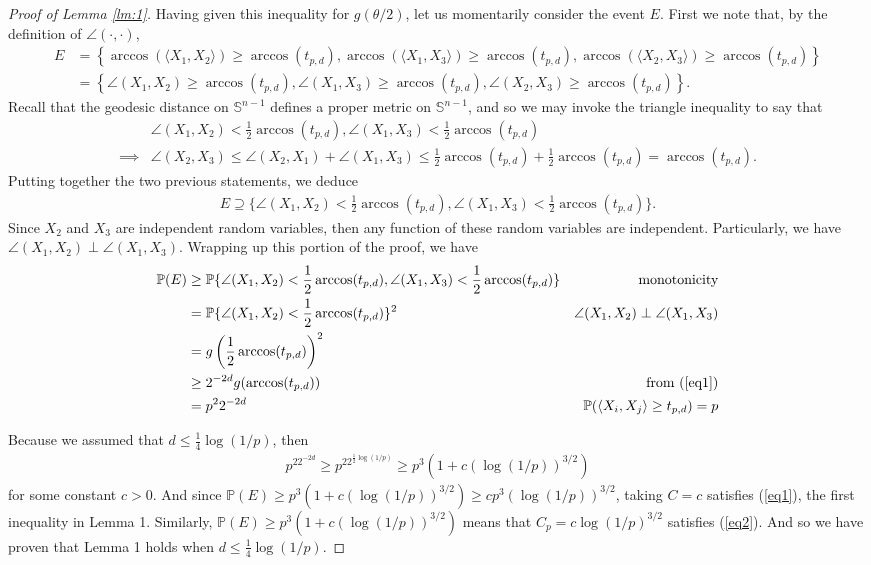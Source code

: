 \documentclass{article}
\begin{document}
\begin{proof}[Proof of Lemma \ref{lm:1}]
Having given this inequality for $g(\theta/2)$, let us momentarily consider the event $E$. First we note that, by the definition of $\angle(\cdot, \cdot)$,
\begin{align*}
    E &= \left\{ \arccos(\langle X_1, X_2 \rangle) \geq \arccos(t_{p,d}), \arccos(\langle X_1, X_3 \rangle) \geq \arccos(t_{p,d}), \arccos(\langle X_2, X_3 \rangle) \geq  \arccos(t_{p,d}) \right\}\\
    &= \left\{ \angle(X_1, X_2) \geq \arccos(t_{p,d}), \angle(X_1, X_3) \geq \arccos(t_{p,d}), \angle(X_2, X_3) \geq  \arccos(t_{p,d}) \right\}.
\end{align*}
Recall that the geodesic distance on $\mathbb{S}^{n-1}$ defines a proper metric on $\mathbb{S}^{n-1}$, and so we may invoke the triangle inequality to say that 
\begin{align*}
    &\angle(X_1, X_2) < \frac{1}{2}\arccos(t_{p,d}), \angle (X_1, X_3) < \frac{1}{2}\arccos(t_{p,d})\\
    \implies & \angle(X_2, X_3) \leq \angle(X_2, X_1) + \angle(X_1, X_3) \leq \frac{1}{2}\arccos(t_{p,d}) + \frac{1}{2}\arccos(t_{p,d}) = \arccos(t_{p,d}).
\end{align*}
Putting together the two previous statements, we deduce
\begin{align*}
    E \supseteq  \{\angle(X_1, X_2) < \frac{1}{2}\arccos(t_{p,d}), \angle (X_1, X_3) < \frac{1}{2}\arccos(t_{p,d})\}.
\end{align*}
Since $X_2$ and $X_3$ are independent random variables, then any function of these random variables are independent. Particularly, we have $\angle(X_1, X_2) \perp \angle(X_1, X_3)$. Wrapping up this portion of the proof, we have
\begin{align*}
    \mathbb{P}(E) & \geq \mathbb{P} \{ \angle(X_1, X_2) < \frac{1}{2} \arccos(t_{p,d}), \angle(X_1, X_3) < \frac{1}{2} \arccos(t_{p,d}) \} & \text{monotonicity}\\
    &= \mathbb{P} \{ \angle(X_1, X_2) < \frac{1}{2} \arccos(t_{p,d})\}^2 & \angle(X_1, X_2) \perp \angle(X_1, X_3)\\
    &= g\left(\frac{1}{2} \arccos(t_{p,d}) \right)^2\\
    &\geq 2^{-2d} g(\arccos(t_{p,d})) & \text{from (\ref{eq1})}\\
    &= p^22^{-2d} & \mathbb{P}(\langle X_i, X_j \rangle \geq t_{p,d}) = p
\end{align*}

Because we assumed that $d \leq \frac{1}{4} \log(1/p)$, then 
\begin{align*}
    p^22^{-2d} \geq p^22^{\frac{1}{2}\log(1/p)} \geq p^3 \left(1 + c\left(\log(1/p) \right)^{3/2} \right)
\end{align*}
for some constant $c > 0$. And since $\mathbb{P}(E) \geq p^3 \left(1 + c\left(\log(1/p) \right)^{3/2} \right) \geq c p^3 \left(\log(1/p) \right)^{3/2}$, taking $C =c$ satisfies (\ref{eq1}), the first inequality in Lemma 1. Similarly, $\mathbb{P}(E) \geq p^3 \left(1 + c\left(\log(1/p) \right)^{3/2} \right)$ means that $C_p = c \log(1/p)^{3/2}$ satisfies (\ref{eq2}). And so we have proven that Lemma 1 holds when $d \leq \frac{1}{4}\log(1/p)$.


\end{proof}
\end{document}

